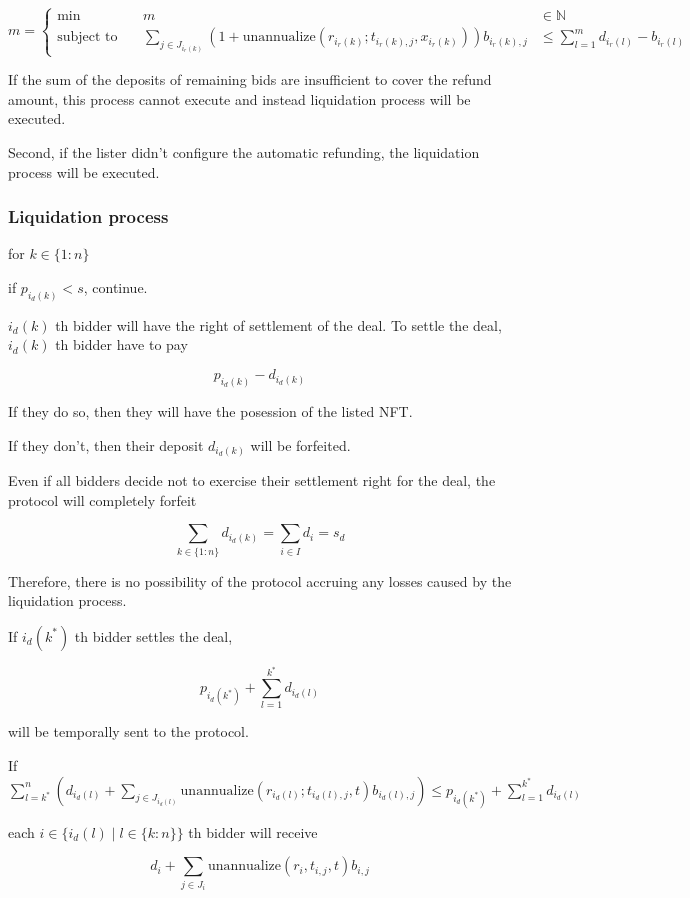 \documentclass[dvipdfmx]{jsarticle}
\begin{document}
$$
  m = \left\{\begin{aligned}
    \min && \ m & \in \mathbb{N} \\
    \text{subject to} && \ \sum_{j \in J_{i_r(k)}} (1 + \text{unannualize}(r_{i_r(k)}; t_{i_r(k),j}, x_{i_r(k)})) b_{i_r(k),j} & \le \sum_{l=1}^m {d_{i_r(l)} - b_{i_r(l)}}
  \end{aligned}\right.
$$

If the sum of the deposits of remaining bids are insufficient to cover the refund amount, this process cannot execute and instead liquidation process will be executed.

Second, if the lister didn't configure the automatic refunding, the liquidation process will be executed.

\subsubsection{Liquidation process}

for $k \in \{1:n\}$

if $p_{i_d(k)} < s$, continue.

$i_d(k)$ th bidder will have the right of settlement of the deal.
To settle the deal, $i_d(k)$ th bidder have to pay

$$
  p_{i_d(k)} - d_{i_d(k)}
$$

If they do so, then they will have the posession of the listed NFT.

If they don't, then their deposit $d_{i_d(k)}$ will be forfeited.

Even if all bidders decide not to exercise their settlement right for the deal,
the protocol will completely forfeit 

$$
  \sum_{k \in \{1:n\}} d_{i_d(k)} = \sum_{i \in I} d_i = s_d
$$

Therefore, there is no possibility of the protocol accruing any losses caused by the liquidation process.

If $i_d(k^*)$ th bidder settles the deal,

$$
  p_{i_d(k^*)} + \sum_{l=1}^{k^*} d_{i_d(l)}
$$

will be temporally sent to the protocol.

If $\sum_{l=k^*}^n \left(d_{i_d(l)} + \sum_{j \in J_{i_d(l)}} \text{unannualize}(r_{i_d(l)}; t_{i_d(l),j}, t) b_{i_d(l),j} \right) \le p_{i_d(k^*)} + \sum_{l=1}^{k^*} d_{i_d(l)}$

each $i \in \{i_d(l) \mid l \in \{k:n\}\}$ th bidder will receive

$$
  d_i + \sum_{j \in J_i} \text{unannualize}(r_i, t_{i,j}, t) b_{i,j}
$$
\end{document}
